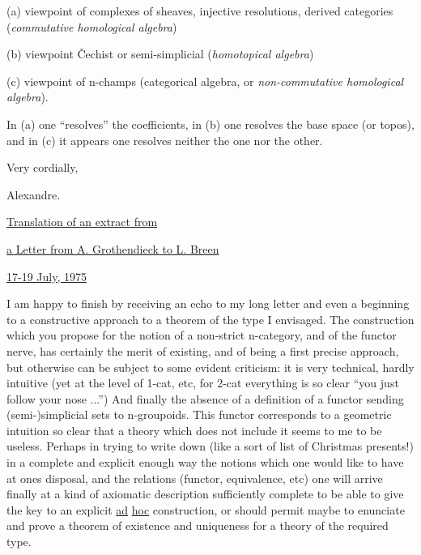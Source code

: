 \documentclass[11pt]{article}
\newcommand{\scanpage}[1]{\par\bigskip\noindent{\small\sffamily[scan #1]}\par}
\newcommand{\mspage}[1]{{\small\sffamily[p.\,#1]}}
\newcommand{\hand}[1]{\textcolor{blue}{#1}}
\newcommand{\uline}[1]{\underline{#1}}
\begin{document}
(a) viewpoint of complexes of sheaves, injective resolutions, derived
categories (\textit{commutative homological algebra})

(b) viewpoint \v{C}echist or semi-simplicial (\textit{homotopical algebra})

(c) viewpoint of n-champs (categorical algebra, or \textit{non-commutative homological
algebra}).

In (a) one ``resolves'' the coefficients, in (b) one resolves the base
space (or topos), and in (c) it appears one resolves neither the one nor the
other.

Very cordially,

Alexandre.

\mspage{\hand{127}}

\clearpage
\scanpage{134-2/128}
\uline{Translation of an extract from}

\uline{a Letter from A. Grothendieck to L. Breen}

\uline{17-19 July, 1975}

I am happy to finish by receiving an echo to my long letter
and even a beginning to a constructive approach to a theorem of
the type I envisaged.  The construction which you propose for the
notion of a non-strict n-category, and of the functor nerve, has
certainly the merit of existing, and of being a first precise
approach, but otherwise can be  subject to some evident criticism:
it is very technical, hardly intuitive (yet at the level of
1-cat, etc, for 2-cat everything  is so clear ``you just follow
your nose ...'')  And finally the absence of a definition of a
functor sending (semi-)simplicial sets to n-groupoids.  This
functor corresponds to a geometric intuition so clear that a theory
which does not include it seems to me to be useless.  Perhaps
in trying to write down (like a sort of list of Christmas presents!)
in a complete and explicit enough way the notions which one would
like to have at ones disposal, and the relations (functor,
equivalence, etc) one will arrive finally at a kind of axiomatic
description sufficiently complete to be able to give the key to
an explicit \uline{ad} \uline{hoc} construction, or should permit maybe to enunciate
and prove a theorem of existence and uniqueness for a theory of
the required type.
\end{document}
